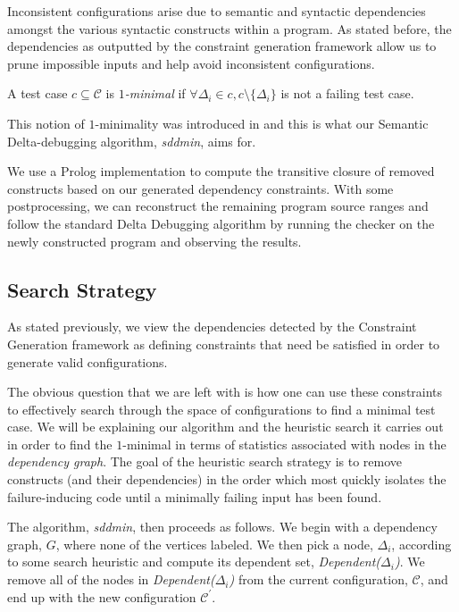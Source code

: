 \documentclass[preprint]{acm_proc_article-sp}
\newenvironment{definition}[1][Definition]{\begin{trivlist}
\item[\hskip \labelsep {\bfseries #1}]}{\end{trivlist}}
\begin{document}
Inconsistent configurations arise due to semantic and syntactic dependencies
amongst the various syntactic constructs within a program. As stated before, the
dependencies as outputted by the constraint generation framework allow us to
prune impossible inputs and help avoid inconsistent configurations.


\begin{definition}
A test case $c \subseteq \mathcal{C}$ is \emph{$1$-minimal} if $\forall \Delta_i
\in c, c \setminus \{ \Delta_i \}$ is not a failing test case.
\end{definition}

This notion of $1$-minimality was introduced in \citep{zeller99} and this is
what our Semantic Delta-debugging algorithm, \emph{sddmin}, aims for. 

We use a Prolog implementation to compute the transitive closure of removed
constructs based on our generated dependency constraints.  With some
postprocessing, we can reconstruct the remaining program source ranges and
follow the standard Delta Debugging algorithm by running the checker on the
newly constructed program and observing the results.


\subsection{Search Strategy}
\label{sddmin}

As stated previously, we view the dependencies detected by the Constraint
Generation framework as defining constraints that need be satisfied in order to
generate valid configurations.


The obvious question that we are left with is how one can use these constraints
to effectively search through the space of configurations to find a minimal test
case. We will be explaining our algorithm and the heuristic search it carries
out in order to find the $1$-minimal in terms of statistics associated with
nodes in the \emph{dependency graph}. The goal of the heuristic search strategy
is to remove constructs (and their dependencies) in the order which most quickly
isolates the failure-inducing code until a minimally failing input has been
found.


The algorithm, \emph{sddmin}, then proceeds as follows. We begin with a
dependency graph, $G$, where none of the vertices labeled. We then pick a node,
$\Delta_i$, according to some search heuristic and compute its dependent set,
\emph{Dependent($\Delta_i$)}. We remove all of the nodes in
\emph{Dependent($\Delta_i$)} from the current configuration, $\mathcal{C}$, and
end up with the new configuration $\mathcal{C}^{'}$. 
\end{document}
